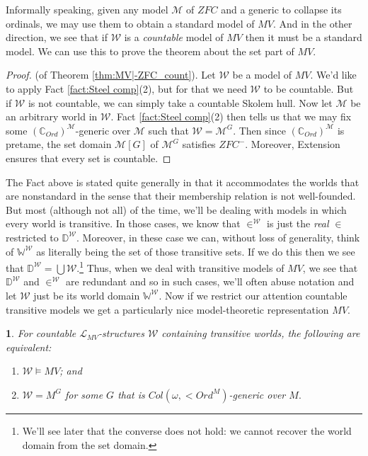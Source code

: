 \documentclass[10pt,a4paper]{amsart}
\numberwithin{equation}{section}
\numberwithin{figure}{section}
\theoremstyle{plain}
\theoremstyle{plain}
\theoremstyle{plain}
\newtheorem{cor}[thm]{\protect\corollaryname}
\theoremstyle{plain}
\theoremstyle{remark}
\theoremstyle{plain}
\theoremstyle{definition}
\providecommand{\corollaryname}{Corollary}
\begin{document}
Informally speaking, given any model $\mathcal{M}$ of $ZFC$ and
a generic to collapse its ordinals, we may use them to obtain a standard
model of $MV$. And in the other direction, we see that if $\mathcal{W}$
is a \emph{countable }model of $MV$ then it must be a standard model.
We can use this to prove the theorem about the set part of $MV$. 
\begin{proof}
(of Theorem \ref{thm:MV|-ZFC_count}). Let $\mathcal{W}$ be a model
of $MV$. We'd like to apply Fact \ref{fact:Steel comp}(2), but for
that we need $\mathcal{W}$ to be countable. But if $\mathcal{W}$
is not countable, we can simply take a countable Skolem hull. Now
let $\mathcal{M}$ be an arbitrary world in $\mathcal{W}$. Fact \ref{fact:Steel comp}(2)
then tells us that we may fix some $(\mathbb{C}_{Ord})^{\mathcal{M}}$-generic
over $\mathcal{M}$ such that $\mathcal{W}=\mathcal{M}^{G}$. Then
since $(\mathbb{C}_{Ord})^{\mathcal{M}}$ is pretame, the set domain
$\mathcal{M}[G]$ of $\mathcal{M}^{G}$ satisfies $ZFC^{-}$. Moreover,
Extension ensures that every set is countable. 
\end{proof}
The Fact above is stated quite generally in that it accommodates
the worlds that are nonstandard in the sense that their membership
relation is not well-founded. But most (although not all) of the time,
we'll be dealing with models in which every world is transitive. In
those cases, we know that $\in^{\mathcal{W}}$ is just the \emph{real
}$\in$ restricted to $\mathbb{D}^{\mathcal{W}}$. Moreover, in these
case we can, without loss of generality, think of $\mathbb{W}^{\mathcal{W}}$
as literally being the set of those transitive sets. If we do this
then we see that $\mathbb{D}^{\mathcal{W}}=\bigcup\mathcal{W}$.\footnote{We'll see later that the converse does not hold: we cannot recover
the world domain from the set domain.} Thus, when we deal with transitive models of $MV$, we see that $\mathbb{D}^{\mathcal{W}}$
and $\in^{\mathcal{W}}$ are redundant and so in such cases, we'll
often abuse notation and let $\mathcal{W}$ just be its world domain
$\mathbb{W}^{\mathcal{W}}$. Now if we restrict our attention countable
transitive models we get a particularly nice model-theoretic representation
$MV$. 
\begin{cor}
For countable $\mathcal{L}_{MV}$-structures $\mathcal{W}$ containing
transitive worlds, the following are equivalent:\label{cor:Steel}
\begin{enumerate}
\item $\mathcal{W}\models MV$; and
\item $\mathcal{W}=M^{G}$ for some $G$ that is $Col(\omega,<Ord^{M})$-generic
over $M.$
\end{enumerate}
\end{cor}
\end{document}
